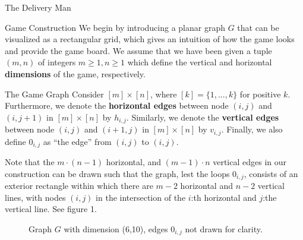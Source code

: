 \begin{section}{The Delivery Man}
  \begin{subsection}{Game Construction}
    We begin by introducing a planar graph $G$ that can be visualized as a rectangular grid, which gives an intuition of how the game looks and provide the game board. We assume that we have been given a tuple $(m, n)$ of integers $m \geq 1, n \geq 1$ which define the vertical and horizontal \textbf{dimensions} of the game, respectively.
    
    \begin{subsubsection}{The Game Graph}
    Consider $[m]\times [n]$, where $[k] = \{1, ..., k\}$ for positive $k$. Furthermore, we denote the \textbf{horizontal edges} between node $(i, j)$ and $(i, j+1)$ in $[m] \times [n]$ by $h_{i,j}$. Similarly, we denote the \textbf{vertical edges} between node $(i, j)$ and $(i+1, j)$ in $[m] \times [n]$ by $v_{i,j}$. Finally, we also define $0_{i,j}$ as ``the edge'' from $(i,j)$ to $(i,j)$. 

    Note that the $m\cdot (n-1)$ horizontal, and $(m-1)\cdot n$ vertical edges in our construction can be drawn such that the graph, lest the loops $0_{i,j}$, consists of an exterior rectangle within which there are $m-2$ horizontal and $n-2$ vertical lines, with nodes $(i, j)$ in the intersection of the $i$:th horizontal and $j$:the vertical line. See figure 1.

      \begin{figure}[H]
        \label{fig:grid}
        \centering
        \caption{Graph $G$ with dimension (6,10), edges $0_{i,j}$ not drawn for clarity.}
      \end{figure}
      

\end{subsubsection}
\end{subsection}
\end{section}

